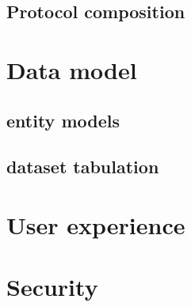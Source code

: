 \documentclass[../thesis]{subfiles}
\begin{document}
\subsection{Protocol composition}



\section{Data model}

\subsection{entity models}

\subsection{dataset tabulation}



\section{User experience}



\section{Security}
\end{document}
